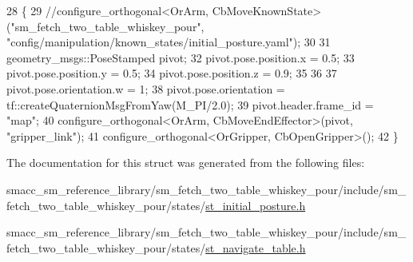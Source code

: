 \begin{DoxyCode}
28         \{
29             \textcolor{comment}{//configure\_orthogonal<OrArm, CbMoveKnownState>("sm\_fetch\_two\_table\_whiskey\_pour",
       "config/manipulation/known\_states/initial\_posture.yaml");}
30 
31             geometry\_msgs::PoseStamped pivot;
32             pivot.pose.position.x = 0.5;
33             pivot.pose.position.y = 0.5;
34             pivot.pose.position.z = 0.9;
35             
36             
37             pivot.pose.orientation.w = 1;
38             pivot.pose.orientation = tf::createQuaternionMsgFromYaw(M\_PI/2.0);
39             pivot.header.frame\_id = \textcolor{stringliteral}{"map"};
40             configure\_orthogonal<OrArm, CbMoveEndEffector>(pivot, \textcolor{stringliteral}{"gripper\_link"});
41             configure\_orthogonal<OrGripper, CbOpenGripper>();
42         \}
\end{DoxyCode}


The documentation for this struct was generated from the following files\+:\begin{DoxyCompactItemize}
\item 
smacc\+\_\+sm\+\_\+reference\+\_\+library/sm\+\_\+fetch\+\_\+two\+\_\+table\+\_\+whiskey\+\_\+pour/include/sm\+\_\+fetch\+\_\+two\+\_\+table\+\_\+whiskey\+\_\+pour/states/\hyperlink{sm__fetch__two__table__whiskey__pour_2include_2sm__fetch__two__table__whiskey__pour_2states_2st__initial__posture_8h}{st\+\_\+initial\+\_\+posture.\+h}\item 
smacc\+\_\+sm\+\_\+reference\+\_\+library/sm\+\_\+fetch\+\_\+two\+\_\+table\+\_\+whiskey\+\_\+pour/include/sm\+\_\+fetch\+\_\+two\+\_\+table\+\_\+whiskey\+\_\+pour/states/\hyperlink{st__navigate__table_8h}{st\+\_\+navigate\+\_\+table.\+h}\end{DoxyCompactItemize}
